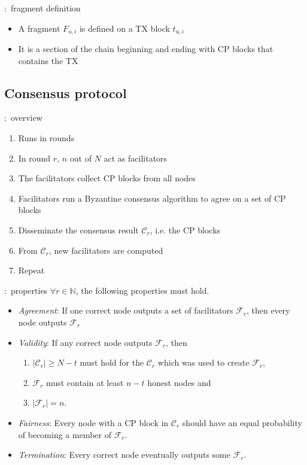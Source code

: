 \documentclass{beamer}
\newcommand{\C}{\mathcal{C}}
\newcommand{\F}{\mathcal{F}}
\begin{document}
\begin{frame}{\subsecname:~fragment definition}
\begin{itemize}
\item A fragment $F_{u, i}$ is defined on a TX block $t_{u, i}$
\item It is a section of the chain beginning and ending with CP blocks that contains the TX
\end{itemize}
\end{frame}

\subsection{Consensus protocol}
\begin{frame}{\subsecname:~overview}
  \begin{enumerate}
    \item Runs in rounds
    \item In round $r$, $n$ out of $N$ act as facilitators
    \item The facilitators collect CP blocks from all nodes
    \item Facilitators run a Byzantine consensus algorithm to agree on a set of CP blocks
    \item Disseminate the consensus result $\C_r$, i.e. the CP blocks
    \item From $\C_r$, new facilitators are computed
    \item Repeat
  \end{enumerate}
\end{frame}

\begin{frame}{\subsecname:~properties}
\label{def:consensus}
$\forall r \in \mathbb{N}$, the following properties must hold.
\begin{itemize}
    \item \emph{Agreement}:
        If one correct node outputs a set of facilitators $\F_r$,
        then every node outputs $\F_r$
    \item \emph{Validity}:
        If any correct node outputs $\F_r$, then 
            \begin{enumerate}
                \item $|\C_r| \ge N - t$ must hold for the $\C_r$ which was used to create $\F_r$,
                \item $\F_r$ must contain at least $n - t$ honest nodes and
                \item $|\F_r| = n$.
            \end{enumerate}
    \item \emph{Fairness}:
        Every node with a CP block in $\C_r$ should have an equal probability of becoming a member of $\F_r$.
    \item \emph{Termination}:
        Every correct node eventually outputs some $\F_r$.
\end{itemize}
\end{frame}
\end{document}
